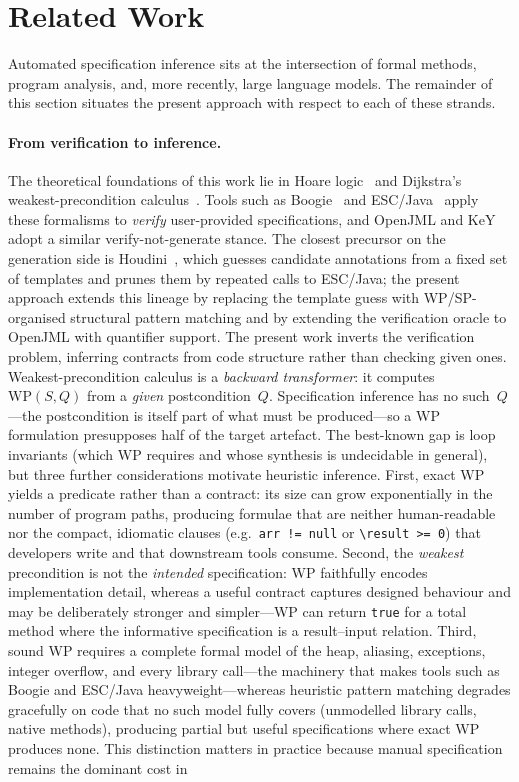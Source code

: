 \section{Related Work}
\label{sec:related}

Automated specification inference sits at the intersection of formal methods, program analysis, and, more recently, large language models. The remainder of this section situates the present approach with respect to each of these strands.

\paragraph{From verification to inference.}
The theoretical foundations of this work lie in Hoare logic~\cite{hoare1969axiomatic} and Dijkstra's weakest-precondition calculus~\cite{dijkstra_guarded_1975, dijkstra1976discipline}. Tools such as Boogie~\cite{barnett2005weakest} and ESC/Java~\cite{flanagan2002extended, chalin2010jml} apply these formalisms to \emph{verify} user-provided specifications, and OpenJML and KeY adopt a similar verify-not-generate stance. The closest precursor on the generation side is Houdini~\cite{flanagan2001houdini}, which guesses candidate annotations from a fixed set of templates and prunes them by repeated calls to ESC/Java; the present approach extends this lineage by replacing the template guess with WP/SP-organised structural pattern matching and by extending the verification oracle to OpenJML with quantifier support. The present work inverts the verification problem, inferring contracts from code structure rather than checking given ones. Weakest-precondition calculus is a \emph{backward transformer}: it computes $\mathrm{WP}(S, Q)$ from a \emph{given} postcondition~$Q$. Specification inference has no such~$Q$---the postcondition is itself part of what must be produced---so a WP formulation presupposes half of the target artefact. The best-known gap is loop invariants (which WP requires and whose synthesis is undecidable in general), but three further considerations motivate heuristic inference. First, exact WP yields a predicate rather than a contract: its size can grow exponentially in the number of program paths, producing formulae that are neither human-readable nor the compact, idiomatic clauses (e.g.\ \verb|arr != null| or \verb|\result >= 0|) that developers write and that downstream tools consume. Second, the \emph{weakest} precondition is not the \emph{intended} specification: WP faithfully encodes implementation detail, whereas a useful contract captures designed behaviour and may be deliberately stronger and simpler---WP can return \verb|true| for a total method where the informative specification is a result--input relation. Third, sound WP requires a complete formal model of the heap, aliasing, exceptions, integer overflow, and every library call---the machinery that makes tools such as Boogie and ESC/Java heavyweight---whereas heuristic pattern matching degrades gracefully on code that no such model fully covers (unmodelled library calls, native methods), producing partial but useful specifications where exact WP produces none. This distinction matters in practice because manual specification remains the dominant cost in 